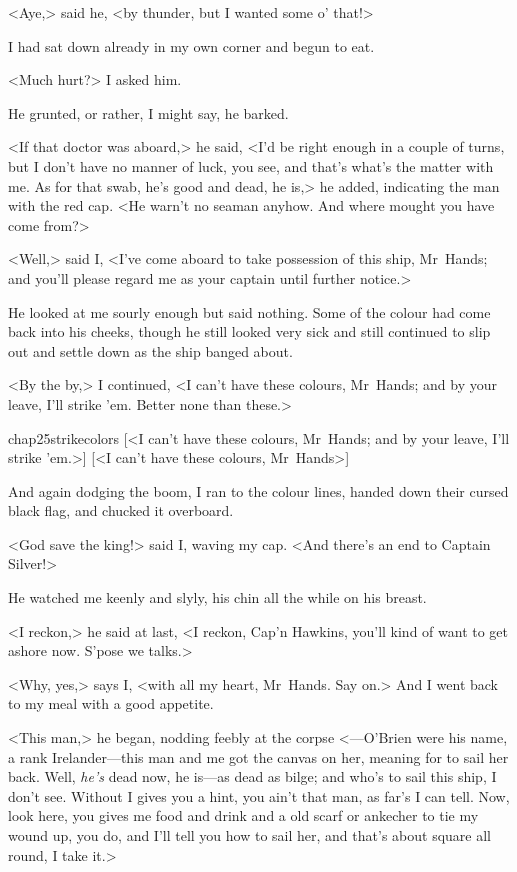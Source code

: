 <Aye,> said he, <by thunder, but I wanted some o' that!>

I had sat down already in my own corner and begun to eat.

<Much hurt?> I asked him.

He grunted, or rather, I might say, he barked.

<If that doctor was aboard,> he said, <I'd be right enough in a couple of turns, but I don't have no manner of luck, you see, and that's what's the matter with me. As for that swab, he's good and dead, he is,> he added, indicating the man with the red cap. <He warn't no seaman anyhow. And where mought you have come from?>

<Well,> said I, <I've come aboard to take possession of this ship, Mr~Hands; and you'll please regard me as your captain until further notice.>

He looked at me sourly enough but said nothing. Some of the colour had come back into his cheeks, though he still looked very sick and still continued to slip out and settle down as the ship banged about.

<By the by,> I continued, <I can't have these colours, Mr~Hands; and by your leave, I'll strike 'em. Better none than these.>


\begin{bwbigpic}
	[\basicscale]
	{chap25strikecolors}
	[<I can't have these colours, Mr~Hands; and by your leave, I'll strike 'em.>]
	[<I can't have these colours, Mr~Hands>]
\end{bwbigpic}

And again dodging the boom, I ran to the colour lines, handed down their cursed black flag, and chucked it overboard.

<God save the king!> said I, waving my cap. <And there's an end to Captain Silver!>

He watched me keenly and slyly, his chin all the while on his breast.

<I reckon,> he said at last, <I reckon, Cap'n Hawkins, you'll kind of want to get ashore now. S'pose we talks.>

<Why, yes,> says I, <with all my heart, Mr~Hands. Say on.> And I went back to my meal with a good appetite.

<This man,> he began, nodding feebly at the corpse <—O'Brien were his name, a rank Irelander—this man and me got the canvas on her, meaning for to sail her back. Well, \textit{he's} dead now, he is—as dead as bilge; and who's to sail this ship, I don't see. Without I gives you a hint, you ain't that man, as far's I can tell. Now, look here, you gives me food and drink and a old scarf or ankecher to tie my wound up, you do, and I'll tell you how to sail her, and that's about square all round, I take it.>

